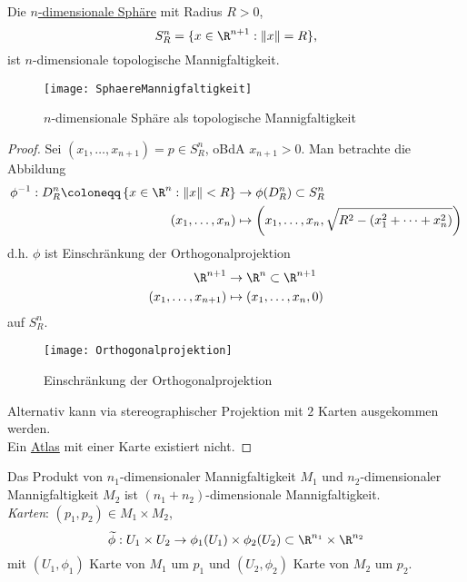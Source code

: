 \begin{example}
\begin{enumerate}
    \begin{minipage}{.45\textwidth}
      \item Die \hyperref[bsp:einheitssphaere]{\( n \)-dimensionale Sphäre} mit Radius \( R > 0 \),
      \begin{equation*}
        S^n_R = \{ x \in \R^{n+1} : \Vert x \Vert = R \}\text{,}
      \end{equation*}
      ist \( n \)-dimensionale topologische Mannigfaltigkeit.
    \end{minipage}
    \hfill
    \begin{minipage}{.45\textwidth}
      \begin{figure}[H]
        \texttt{[image: SphaereMannigfaltigkeit]}
        \caption{\( n \)-dimensionale Sphäre als topologische Mannigfaltigkeit}
      \end{figure}
    \end{minipage}
    \begin{proof}
      Sei \( (x_1, \dots, x_{n+1}) = p \in S^n_R \), oBdA \( x_{n+1} > 0 \). Man betrachte die Abbildung
      \begin{align*}
        \phi^{-1} : D^n_R \coloneqq \left \{ x \in \R^n : \Vert x \Vert < R \right \} &\to \phi(D^n_R) \subset S^n_R \\
          (x_1, \dots, x_n) &\mapsto \left(x_1, \dots, x_n, \sqrt{R^2-(x_1^2 + \cdots + x_n^2)}\right)
      \end{align*}
      d.h. \( \phi \) ist Einschränkung der Orthogonalprojektion
      \begin{align*}
        \R^{n+1} &\to \R^n \subset \R^{n+1} \\
          (x_1, \dots, x_{n+1}) &\mapsto (x_1, \dots, x_n, 0)
      \end{align*}
      auf \( S_R^n \).
      \begin{figure}[H]
        \texttt{[image: Orthogonalprojektion]}
        \caption{Einschränkung der Orthogonalprojektion}
      \end{figure}
      Alternativ kann via stereographischer Projektion mit \( 2 \) Karten ausgekommen werden. \\
      Ein \hyperref[def:atlas]{Atlas} mit einer Karte existiert nicht.
    \end{proof}
    \item Das Produkt von \( n_1 \)-dimensionaler Mannigfaltigkeit \( M_1 \) und \( n_2 \)-dimensionaler Mannigfaltigkeit \( M_2 \) ist \( (n_1+n_2) \)-dimensionale Mannigfaltigkeit. \\
    \emph{Karten}: \( (p_1, p_2) \in M_1 \times M_2 \),
    \begin{equation*}
      \widetilde{\phi} : U_1 \times U_2 \to \phi_1(U_1) \times \phi_2(U_2) \subset \R^{n_1} \times \R^{n_2}
    \end{equation*}
    mit \( (U_1, \phi_1) \) Karte von \( M_1 \) um \( p_1 \) und \( (U_2, \phi_2) \) Karte von \( M_2 \) um \( p_2 \).
  \end{enumerate}
\end{example}

